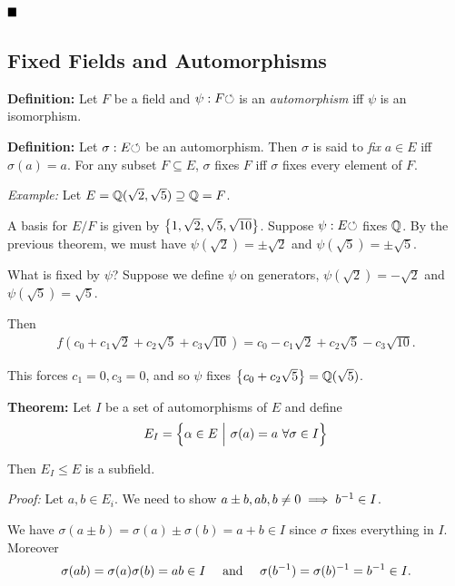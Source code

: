 \(\qed\)

\hypertarget{fixed-fields-and-automorphisms}{%
\subsection{Fixed Fields and
Automorphisms}\label{fixed-fields-and-automorphisms}}

\textbf{Definition:} Let \(F\) be a field and \(\psi: F {\circlearrowleft}\) is an
\emph{automorphism} iff \(\psi\) is an isomorphism.

\textbf{Definition:} Let \(\sigma: E{\circlearrowleft}\) be an automorphism. Then
\(\sigma\) is said to \emph{fix} \(a\in E\) iff \(\sigma(a) = a\). For
any subset \(F \subseteq E\), \(\sigma\) fixes \(F\) iff \(\sigma\)
fixes every element of \(F\).

\emph{Example:} Let \(E = {\mathbb{Q}}(\sqrt 2, \sqrt 5) \supseteq {\mathbb{Q}} = F\).

A basis for \(E/F\) is given by
\(\left\{{1, \sqrt 2, \sqrt 5, \sqrt {10}}\right\}\). Suppose
\(\psi: E{\circlearrowleft}\) fixes \({\mathbb{Q}}\). By the previous theorem, we must have
\(\psi(\sqrt 2) = \pm \sqrt 2\) and \(\psi(\sqrt 5) = \pm \sqrt 5\).

What is fixed by \(\psi\)? Suppose we define \(\psi\) on generators,
\(\psi(\sqrt 2) = -\sqrt 2\) and \(\psi(\sqrt 5) = \sqrt 5\).

Then
\begin{align*}
f(c_0 + c_1 \sqrt 2 + c_2 \sqrt 5 + c_3 \sqrt{10}) = c_0 - c_1\sqrt 2 + c_2 \sqrt 5 - c_3\sqrt{10}
.\end{align*}

This forces \(c_1 = 0, c_3 = 0\), and so \(\psi\) fixes
\(\left\{{ c_0 + c_2 \sqrt 5 }\right\} = {\mathbb{Q}}(\sqrt 5)\).

\textbf{Theorem:} Let \(I\) be a set of automorphisms of \(E\) and
define
\begin{align*}
E_I = \left\{{\alpha \in E {~\mathrel{\Big|}~} \sigma(a) = a ~\forall \sigma \in I}\right\}
\end{align*}

Then \(E_I \leq E\) is a subfield.

\emph{Proof:} Let \(a,b \in E_i\). We need to show
\(a \pm b, ab, b\neq 0 \implies b^{-1} \in I\).

We have \(\sigma(a\pm b) = \sigma(a) \pm \sigma(b) = a + b \in I\) since
\(\sigma\) fixes everything in \(I\). Moreover
\begin{align*}
\sigma(ab) = \sigma(a)\sigma(b) = ab \in I
\quad \text{ and } \quad
\sigma(b^{-1}) = \sigma(b)^{-1} = b^{-1} \in I
.\end{align*}

